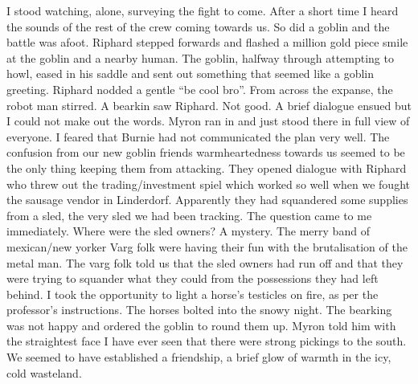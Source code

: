 I stood watching, alone, surveying the fight to come. After a short time I heard the sounds of the rest of the crew coming towards us. So did a goblin and the battle was afoot. Riphard stepped forwards and flashed a million gold piece smile at the goblin and a nearby human. The goblin, halfway through attempting to howl, eased in his saddle and sent out something that seemed like a goblin greeting. Riphard nodded a gentle “be cool bro”. From across the expanse, the robot man stirred. A bearkin saw Riphard. Not good. A brief dialogue ensued but I could not make out the words. Myron ran in and just stood there in full view of everyone. I feared that Burnie had not communicated the plan very well. The confusion from our new goblin friends warmheartedness towards us seemed to be the only thing keeping them from attacking. They opened dialogue with Riphard who threw out the trading/investment spiel which worked so well when we fought the sausage vendor in Linderdorf. Apparently they had squandered some supplies from a sled, the very sled we had been tracking. The question came to me immediately. Where were the sled owners? A mystery. The merry band of mexican/new yorker Varg folk were having their fun with the brutalisation of the metal man. The varg folk told us that the sled owners had run off and that they were trying to squander what they could from the possessions they had left behind. I took the opportunity to light a horse’s testicles on fire, as per the professor’s instructions. The horses bolted into the snowy night. The bearking was not happy and ordered the goblin to round them up. Myron told him with the straightest face I have ever seen that there were strong pickings to the south. We seemed to have established a friendship, a brief glow of warmth in the icy, cold wasteland.\medskip

